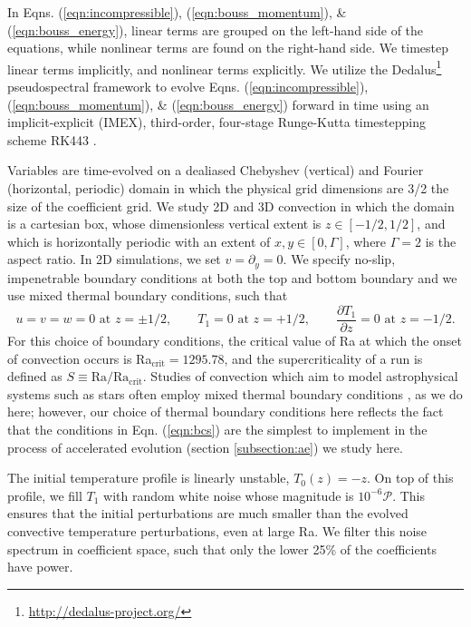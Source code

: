 \documentclass[aps, pre, onecolumn, nofootinbib, notitlepage, groupedaddress, amsfonts, amssymb, amsmath, longbibliography]{revtex4-1}
\begin{document}
In Eqns. (\ref{eqn:incompressible}), (\ref{eqn:bouss_momentum}), \& (\ref{eqn:bouss_energy}),
linear terms are grouped on the left-hand side of the equations, while nonlinear terms
are found on the right-hand side. We timestep linear terms implicitly, and nonlinear
terms explicitly.
We utilize the 
Dedalus\footnote{\url{http://dedalus-project.org/}} 
pseudospectral framework \cite{burns&all2016} to evolve  
Eqns. (\ref{eqn:incompressible}), (\ref{eqn:bouss_momentum}), \& (\ref{eqn:bouss_energy}) 
forward in time
using an implicit-explicit (IMEX), third-order, four-stage 
Runge-Kutta timestepping scheme RK443 \cite{ascher&all1997}.  

Variables are time-evolved on a dealiased Chebyshev (vertical)
and Fourier (horizontal, periodic) domain in which the
physical grid dimensions are 3/2 the size of the coefficient grid.  
We study 2D and 3D convection in which the domain is a cartesian box, 
whose dimensionless vertical extent is $z \in [-1/2, 1/2]$, 
and which is horizontally periodic with an extent of $x, y \in [0, \Gamma]$,
where $\Gamma = 2$ is the aspect ratio. 
In 2D simulations, we set $v = \partial_y = 0$.
We specify no-slip, impenetrable boundary conditions at both the top and
bottom boundary and we use mixed thermal boundary conditions, such that
\begin{equation}
u = v = w = 0 \, \, \text{at}\,\,z = \pm 1/2, \qquad T_1 = 0 \,\,\text{at}\,\, z=+1/2, \qquad
\frac{\partial T_1}{\partial z} = 0\,\,\text{at}\,\,z=-1/2.
\label{eqn:bcs}
\end{equation}
For this choice of boundary conditions, the critical value of Ra at which
the onset of convection occurs is Ra$_{\text{crit}} = 1295.78$, and the
supercriticality of a run is defined as $S \equiv \text{Ra}/\text{Ra}_{\text{crit}}$.
Studies of convection which aim to model
astrophysical systems such as stars often employ mixed thermal
boundary conditions \cite{hurlburt&all1984, cattaneo&all1991, korre&all2017},
as we do here; however, our choice of thermal boundary conditions here
reflects the fact that the conditions in Eqn. (\ref{eqn:bcs}) are the simplest
to implement in the process of accelerated evolution (section \ref{subsection:ae})
we study here.

The initial temperature profile is linearly unstable,
$T_0(z) = -z$. On top of this profile, we fill $T_1$ with
random white noise whose magnitude is $10^{-6}\mathcal{P}$.
This ensures that the initial perturbations are much smaller than the
evolved convective temperature perturbations, even at large Ra.
We filter this noise spectrum in coefficient space, 
such that only the lower 25\% of the coefficients
have power.
\end{document}
